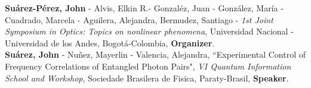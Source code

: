 \documentclass[10pt, a4paper]{article}
\newcommand{\years}[1]{\marginnote{\scriptsize #1}}
\begin{document}
\years{2018}\textbf{Suárez-Pérez, John} - Alvis, Elkin R.- Gonzaléz, Juan - González, María - Cuadrado, Marcela - Aguilera, Alejandra, Bermudez, Santiago - \emph{1st Joint Symposium in Optics: Topics on nonlinear phenomena}, Universidad Nacional - Universidad de los Andes, Bogotá-Colombia, \textbf{Organizer}.\\



\years{2017}\textbf{Suárez, John} - Nuñez, Mayerlin - Valencia, Alejandra, “Experimental Control of Frequency Correlations of Entangled Photon Pairs", \emph{VI Quantum Information School and Workshop}, Sociedade Brasilera de Fisica, Paraty-Brasil, \textbf{Speaker}.




\end{document}
